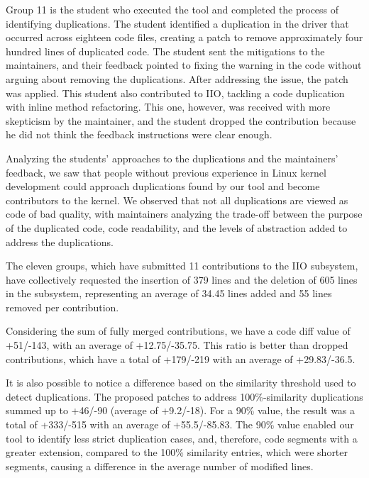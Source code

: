 \documentclass[10pt,conference]{IEEEtran}
\begin{document}
Group 11 is the student who executed the tool and completed the process of identifying duplications. The student identified a duplication in the driver that occurred across eighteen code files, creating a patch to remove approximately four hundred lines of duplicated code. The student sent the mitigations to the maintainers, and their feedback pointed to fixing the warning in the code without arguing about removing the duplications. After addressing the issue, the patch was applied. This student also contributed to IIO, tackling a code duplication with inline method refactoring. This one, however, was received with more skepticism by the maintainer, and the student dropped the contribution because he did not think the feedback instructions were clear enough.

Analyzing the students' approaches to the duplications and the maintainers' feedback, we saw that people without previous experience in Linux kernel development could approach duplications found by our tool and become contributors to the kernel. We observed that not all duplications 
are viewed as code of bad quality, with maintainers analyzing the trade-off between the purpose of the duplicated code, code readability, and the levels of abstraction added to address the duplications.


The eleven groups, which have submitted 11 contributions to the IIO subsystem, have collectively requested the insertion of 379 lines and the deletion of 605 lines in the subsystem, representing an average of 34.45 lines added and 55 lines removed per contribution.

Considering the sum of fully merged contributions, we have a code diff value of +51/-143, with an average of +12.75/-35.75. This ratio is better than dropped contributions, which have a total of +179/-219 with an average of +29.83/-36.5.

It is also possible to notice a difference based on the similarity threshold used to detect duplications. The proposed patches to address 100\%-similarity duplications summed up to +46/-90 (average of +9.2/-18). For a 90\% value, the result was a total of +333/-515 with an average of +55.5/-85.83. The 90\% value enabled our tool to identify less strict duplication cases, and, therefore, code segments with a greater extension, compared to the 100\% similarity entries, which were shorter segments, causing a difference in the average number of modified lines.
\end{document}
